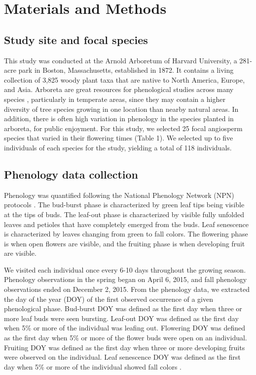 \documentclass{article}
\begin{document}
\section* {Materials and Methods}
\subsection*{Study site and focal species}
This study was conducted at the Arnold Arboretum of Harvard University, a 281-acre park in Boston, Massachusetts, established in 1872. It contains a living collection of 3,825 woody plant taxa that are native to North America, Europe, and Asia. Arboreta are great resources for phenological studies across many species \citep{primack2009a}, particularly in temperate areas, since they may contain a higher diversity of tree species growing in one location than nearby natural areas. In addition, there is often high variation in phenology in the species planted in arboreta, for public enjoyment. For this study, we selected 25 focal angiosperm species that varied in their flowering times (Table 1). We selected up to five individuals of each species for the study, yielding a total of 118 individuals.

\subsection*{Phenology data collection}
Phenology was quantified following the National Phenology Network (NPN) protocols \citep{denny2014}. The bud-burst phase is characterized by green leaf tips being visible at the tips of buds. The leaf-out phase is characterized by visible fully unfolded leaves and petioles that have completely emerged from the buds. Leaf senescence is characterized by leaves changing from green to fall colors. The flowering phase is when open flowers are visible, and the fruiting phase is when developing fruit are visible. 
\par We visited each individual once every 6-10 days throughout the growing season. Phenology observations in the spring began on April 6, 2015, and fall phenology observations ended on December 2, 2015.
From the phenology data, we extracted the day of the year (DOY) of the first observed occurrence of a given phenological phase. Bud-burst DOY was defined as the first day when three or more leaf buds were seen bursting. Leaf-out DOY was defined as the first day when 5\% or more of the individual was leafing out. Flowering DOY was defined as the first day when 5\% or more of the flower buds were open on an individual. Fruiting DOY was defined as the first day when three or more developing fruits were observed on the individual. Leaf senescence DOY was defined as the first day when 5\% or more of the individual showed fall colors \citep{denny2014}.
\end{document}
